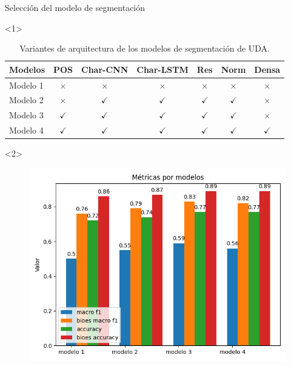 \documentclass{beamer}
\begin{document}
\begin{frame}{Selección del modelo de segmentación}
    \begin{onlyenv}<1>
        \begin{table}
            \begin{center}
                \begin{tabular}{|l|c|c|c|c|c|c|} \hline
                Modelos 		& POS       & Char-CNN  & Char-LSTM & Res       & Norm      & Densa  \\ \hline
                Modelo 1		& $\times$	& $\times$    & $\times$    & $\times$	& $\times$    & $\times$ \\ \hline
                Modelo 2		& $\times$	& $\checkmark$    & $\checkmark$    & $\checkmark$	& $\checkmark$    & $\times$ \\ \hline
                Modelo 3		& $\checkmark$	& $\checkmark$    & $\checkmark$    & $\checkmark$	& $\checkmark$    & $\times$ \\ \hline
                Modelo 4		& $\checkmark$	& $\checkmark$    & $\checkmark$    & $\checkmark$	& $\checkmark$    & $\checkmark$ \\ \hline
                \end{tabular}
            \caption{Variantes de arquitectura de los modelos de segmentación de UDA.}
            \end{center}
        \end{table}
    \end{onlyenv}
    \begin{onlyenv}<2>
        \begin{figure}
            \includegraphics[scale=0.6]{Graphics/persuasive_essays_all_linked_macro_micro_metrics.png}

\end{figure}
\end{onlyenv}
\end{frame}
\end{document}
